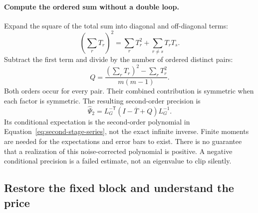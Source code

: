\documentclass[11pt]{article}
\begin{document}
\paragraph{Compute the ordered sum without a double loop.}
Expand the square of the total sum into diagonal and off-diagonal terms:
\begin{equation}
 \left(\sum_rT_r\right)^2
 =\sum_r T_r^2+\sum_{r\ne s}T_rT_s.
\end{equation}
Subtract the first term and divide by the number of ordered distinct pairs:
\begin{equation}
 Q=\frac{(\sum_rT_r)^2-\sum_rT_r^2}{m(m-1)}.
\end{equation}
Both orders occur for every pair. Their combined contribution is symmetric
when each factor is symmetric. The resulting second-order precision is
\begin{equation}
 \widehat\Psi_2=L_G^{-\mathsf T}(I-\overline T+Q)L_G^{-1}.
\end{equation}
Its conditional expectation is the second-order polynomial in
Equation~\eqref{eq:second-stage-series}, not the exact infinite inverse.
Finite moments are needed for the expectations and error bars to exist.
There is no guarantee that a realization of this noise-corrected polynomial
is positive. A negative conditional precision is a failed estimate, not
an eigenvalue to clip silently.

\subsection{Restore the fixed block and understand the price}
\end{document}
